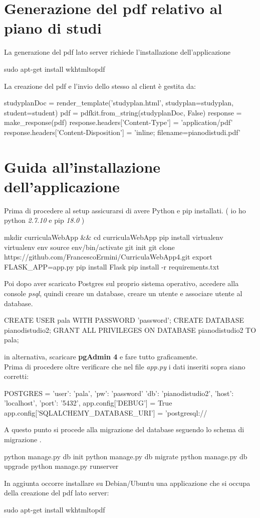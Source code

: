 \documentclass{article}
\begin{document}
\section{Generazione del pdf relativo al piano di studi}
La generazione del pdf lato server richiede l'installazione dell'applicazione
\begin{shell}
sudo apt-get install wkhtmltopdf
\end{shell}
La creazione del pdf e l'invio dello stesso al client è gestita da:
\begin{python}
	studyplanDoc = render_template('studyplan.html', studyplan=studyplan, student=student)
    pdf = pdfkit.from_string(studyplanDoc, False)
    response = make_response(pdf)
    response.headers['Content-Type'] = 'application/pdf'
    response.headers['Content-Disposition'] = 'inline; filename=pianodistudi.pdf'
\end{python}

\newpage
\section{Guida all'installazione dell'applicazione}
Prima di procedere al setup assicurarsi di avere Python e pip installati. ( io ho python \textit{2.7.10} e pip \textit{18.0} ) 
\begin{shell}[caption=Setup Flask]
mkdir curriculaWebApp && cd curriculaWebApp
pip install virtualenv
virtualenv env
source env/bin/activate
git init
git clone https://github.com/FrancescoErmini/CurriculaWebApp4.git
export FLASK_APP=app.py
pip install Flask
pip install -r requirements.txt
\end{shell}
Poi dopo aver scaricato Postgres sul  proprio sistema operativo, accedere alla console \emph{psql}, quindi creare un database, creare un utente e associare utente al database.
\begin{shell}[caption=Create database]
CREATE USER pala WITH PASSWORD 'password';
CREATE DATABASE pianodistudio2;
GRANT ALL PRIVILEGES ON DATABASE pianodistudio2 TO pala;
\end{shell}
in alternativa, scaricare \textbf{pgAdmin 4} e fare tutto graficamente.\\
Prima di procedere oltre verificare che nel file \emph{app.py} i dati inseriti sopra siano corretti:
\begin{python}[firstnumber=16, caption=Flask db configuration]
POSTGRES = {
    'user': 'pala',
    'pw': 'password'
    'db': 'pianodistudio2',
    'host': 'localhost',
    'port': '5432',
}
app.config['DEBUG'] = True
app.config['SQLALCHEMY_DATABASE_URI'] = 'postgresql://%
\end{python}
A questo punto si procede alla migrazione del database seguendo lo schema di migrazione \cite{ref1}. 
\begin{shell}[caption=Initialize database]
python manage.py db init
python manage.py db migrate
python manage.py db upgrade
python manage.py runserver
\end{shell}
In aggiunta occorre installare su Debian/Ubuntu una applicazione che si occupa della creazione del pdf lato server:
\begin{shell}
sudo apt-get install wkhtmltopdf
\end{shell}
\end{document}
